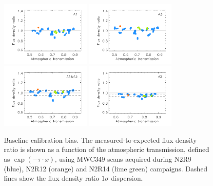 \begin{figure}[ht!]
  \begin{center}
    \includegraphics[clip=true, trim={0.9cm, 0, 0, 0.6cm},width=0.4\textwidth]{Figures/Calibration/plot_flux_density_ratio_MWC349_obstau_corrected_skydip_narrow_a1.pdf}
    \includegraphics[clip=true, trim={0.9cm, 0, 0, 0.6cm},width=0.4\textwidth]{Figures/Calibration/plot_flux_density_ratio_MWC349_obstau_corrected_skydip_narrow_a3.pdf}
    \includegraphics[clip=true, trim={0.9cm, 0, 0, 0.6cm},width=0.4\textwidth]{Figures/Calibration/plot_flux_density_ratio_MWC349_obstau_corrected_skydip_narrow_1mm.pdf}
    \includegraphics[clip=true, trim={0.9cm, 0, 0, 0.6cm},width=0.4\textwidth]{Figures/Calibration/plot_flux_density_ratio_MWC349_obstau_corrected_skydip_narrow_a2.pdf}
    \caption[Baseline calibration bias]{Baseline calibration
      bias. The measured-to-expected flux density ratio is shown as a
      function of the atmospheric transmission, defined as $\exp
      \left( - \tau \cdot x \right)$, using MWC349 scans acquired during N2R9 (blue),
      N2R12 (orange) and N2R14 (lime green) campaigns. Dashed lines
      show the flux density ratio $1 \sigma $ dispersion.}
    \label{fig:mwc349_obstau_corrected_skydip}
  \end{center}
\end{figure}

